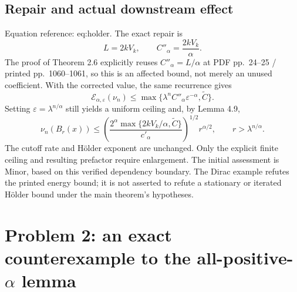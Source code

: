 \documentclass[10pt]{article}
\begin{document}
\subsection*{Repair and actual downstream effect}
Equation reference: eq:holder. The exact repair is \[L=2kV_k,\qquad C''_\alpha=\frac{2kV_k}{\alpha}.\] The proof of Theorem 2.6 explicitly reuses \(C''_\alpha=L/\alpha\) at PDF pp. 24–25 / printed pp. 1060–1061, so this is an affected bound, not merely an unused coefficient. With the corrected value, the same recurrence gives \[\mathcal E_{\alpha,\varepsilon}(\nu_n)
 \le\max\{\lambda^n C''_\alpha\varepsilon^{-\alpha},\widetilde C\}.\] Setting \(\varepsilon=\lambda^{n/\alpha}\) still yields a uniform ceiling and, by Lemma 4.9, \[
 \nu_n(B_r(x))
 \le
 \left(\frac{2^\alpha\max\{2kV_k/\alpha,\widetilde C\}}{c'_\alpha}\right)^{1/2}
 r^{\alpha/2},\qquad r>\lambda^{n/\alpha}.\] The cutoff rate and Hölder exponent are unchanged. Only the explicit finite ceiling and resulting prefactor require enlargement. The initial assessment is Minor, based on this verified dependency boundary. The Dirac example refutes the printed energy bound; it is not asserted to refute a stationary or iterated Hölder bound under the main theorem’s hypotheses.\par
\section*{Problem 2: an exact counterexample to the all-positive-\(\alpha\) lemma}
\end{document}
